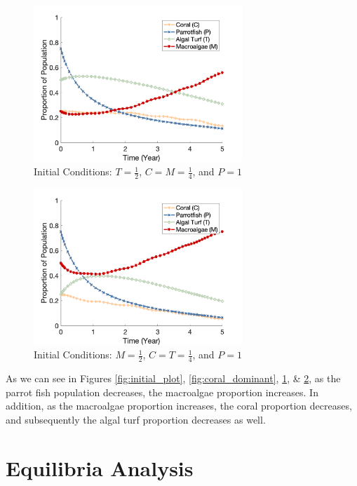 \documentclass[12pt]{article}
\begin{document}
\begin{figure}[H]
    \centering
    \includegraphics[width=0.7\textwidth]{Latex/Figures/Graphs/0.25C_0.5T_0.25M.png}
    \caption{Initial Conditions: $T = \frac{1}{2}$, $C = M = \frac{1}{4}$, and $P = 1$}
    \label{fig:turf_dominant}
\end{figure}
\begin{figure}[H]
    \centering
    \includegraphics[width=0.7\textwidth]{Latex/Figures/Graphs/0.25C_0.25T_0.5M.png}
    \caption{Initial Conditions: $M = \frac{1}{2}$, $C = T = \frac{1}{4}$, and $P = 1$}
    \label{fig:macroalgae_dominant}
\end{figure}
As we can see in Figures \ref{fig:initial_plot}, \ref{fig:coral_dominant}, \ref{fig:turf_dominant}, \& \ref{fig:macroalgae_dominant}, as the parrot fish population decreases, the macroalgae proportion increases. In addition, as the macroalgae proportion increases, the coral proportion decreases, and subsequently the algal turf proportion decreases as well.\\

\section{Equilibria Analysis}
\end{document}
